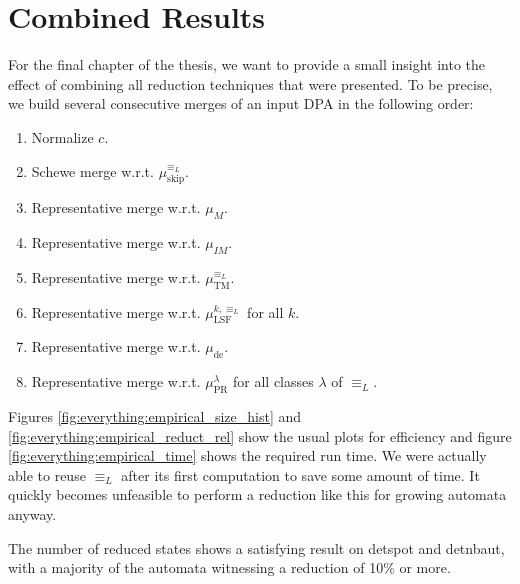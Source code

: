 
\chapter{Combined Results}
\label{chap:everything}

For the final chapter of the thesis, we want to provide a small insight into the effect of combining all reduction techniques that were presented. To be precise, we build several consecutive merges of an input DPA in the following order:
\begin{enumerate}
	\item Normalize $c$.
	\item Schewe merge w.r.t. $\mu_\text{skip}^{\equiv_L}$.
	\item Representative merge w.r.t. $\mu_M$.
	\item Representative merge w.r.t. $\mu_{IM}$.
	\item Representative merge w.r.t. $\mu_\text{TM}^{\equiv_L}$.
	\item Representative merge w.r.t. $\mu_\text{LSF}^{k,\equiv_L}$ for all $k$.
	\item Representative merge w.r.t. $\mu_\text{de}$.
	\item Representative merge w.r.t. $\mu_\text{PR}^\lambda$ for all classes $\lambda$ of $\equiv_L$.
\end{enumerate}

Figures \ref{fig:everything:empirical_size_hist} and \ref{fig:everything:empirical_reduct_rel} show the usual plots for efficiency and figure \ref{fig:everything:empirical_time} shows the required run time. We were actually able to reuse $\equiv_L$ after its first computation to save some amount of time. It quickly becomes unfeasible to perform a reduction like this for growing automata anyway.

The number of reduced states shows a satisfying result on \textsf{detspot} and \textsf{detnbaut}, with a majority of the automata witnessing a reduction of 10\% or more.


